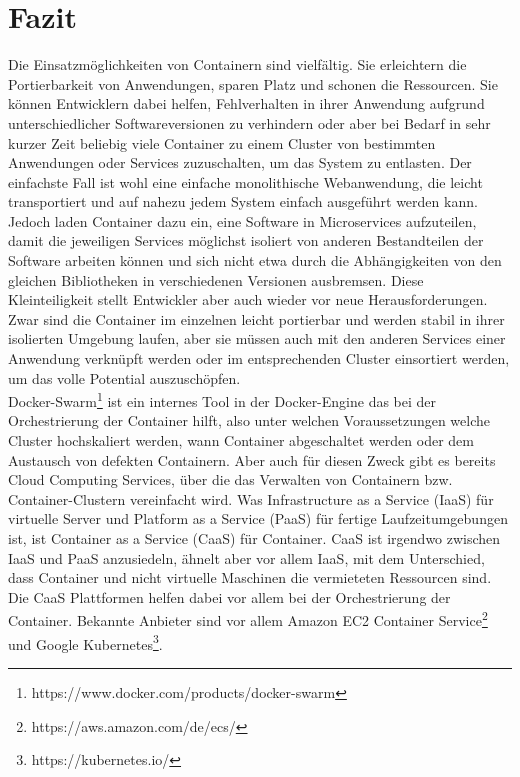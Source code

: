 \chapter{Fazit}

Die Einsatzmöglichkeiten von Containern sind vielfältig. Sie erleichtern die Portierbarkeit von Anwendungen, sparen Platz und schonen die Ressourcen. Sie können Entwicklern dabei helfen, Fehlverhalten in ihrer Anwendung aufgrund unterschiedlicher Softwareversionen zu verhindern oder aber bei Bedarf in sehr kurzer Zeit beliebig viele Container zu einem Cluster von bestimmten Anwendungen oder Services zuzuschalten, um das System zu entlasten. Der einfachste Fall ist wohl eine einfache monolithische Webanwendung, die leicht transportiert und auf nahezu jedem System einfach ausgeführt werden kann. Jedoch laden Container dazu ein, eine Software in Microservices aufzuteilen, damit die jeweiligen Services möglichst isoliert von anderen Bestandteilen der Software arbeiten können und sich nicht etwa durch die Abhängigkeiten von den gleichen Bibliotheken in verschiedenen Versionen ausbremsen. Diese Kleinteiligkeit stellt Entwickler aber auch wieder vor neue Herausforderungen. Zwar sind die Container im einzelnen leicht portierbar und werden stabil in ihrer isolierten Umgebung laufen, aber sie müssen auch mit den anderen Services einer Anwendung verknüpft werden oder im entsprechenden Cluster einsortiert werden, um das volle Potential auszuschöpfen.\\

\noindent Docker-Swarm\footnote{https://www.docker.com/products/docker-swarm} ist ein internes Tool in der Docker-Engine das bei der Orchestrierung der Container hilft, also unter welchen Voraussetzungen welche Cluster hochskaliert werden, wann Container abgeschaltet werden oder dem Austausch von defekten Containern.
Aber auch für diesen Zweck gibt es bereits Cloud Computing Services, über die das Verwalten von Containern bzw. Container-Clustern vereinfacht wird. Was Infrastructure as a Service (IaaS) für virtuelle Server und Platform as a Service (PaaS) für fertige Laufzeitumgebungen ist, ist Container as a Service (CaaS) für Container. CaaS ist irgendwo zwischen IaaS und PaaS anzusiedeln, ähnelt aber vor allem IaaS, mit dem Unterschied, dass Container und nicht virtuelle Maschinen die vermieteten Ressourcen sind. Die CaaS Plattformen helfen dabei vor allem bei der Orchestrierung der Container. Bekannte Anbieter sind vor allem Amazon EC2 Container Service\footnote{https://aws.amazon.com/de/ecs/} und Google Kubernetes\footnote{https://kubernetes.io/}.\\

